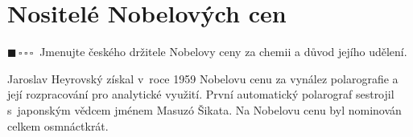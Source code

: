 \documentclass{book}
\newcommand{\jeden}{$\blacksquare \, \square \, \square \, \square \; \; $}
\renewenvironment{quotation}{\par}{\par} %
\begin{document}
\newpage %
\section{Nositelé Nobelových cen}
\begin{quotation}
\jeden Jmenujte českého držitele Nobelovy ceny za chemii a důvod jejího udělení. 
\end{quotation} \dotfill \par 
Jaroslav Heyrovský získal v~roce 1959 Nobelovu cenu za vynález polarografie
a její rozpracování pro analytické využití. První automatický polarograf
sestrojil s~japonským vědcem jménem Masuzó Šikata. Na Nobelovu cenu
byl nominován celkem osmnáctkrát.
\end{document}
